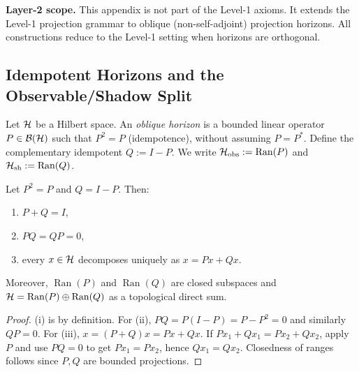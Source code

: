 \label{sec:oblique-horizons}

\noindent\textbf{Layer-2 scope.}
This appendix is not part of the Level-1 axioms. It extends the Level-1
projection grammar to oblique (non-self-adjoint) projection horizons. All
constructions reduce to the Level-1 setting when horizons are orthogonal.

\subsection{Idempotent Horizons and the Observable/Shadow Split}
\label{subsec:oblique-horizons-split}

\begin{definition}
\label{def:oblique-horizon}
Let $\mathcal{H}$ be a Hilbert space. An \emph{oblique horizon} is a bounded linear operator $P\in \mathcal{B}(\mathcal{H})$ such that $P^2 = P$ (idempotence), without assuming $P=P^\ast$.
Define the complementary idempotent $Q := I - P$.
We write $\mathcal{H}_{\mathrm{obs}} := \operatorname{Ran}(P)$ and $\mathcal{H}_{\mathrm{sh}} := \operatorname{Ran}(Q)$.
\end{definition}

\begin{lemma}
\label{lem:idempotent-split-algebra}
Let $P^2=P$ and $Q=I-P$. Then:
\begin{enumerate}[label=(\roman*)]
\item $P+Q=I$,
\item $PQ=QP=0$,
\item every $x\in \mathcal{H}$ decomposes uniquely as $x = Px + Qx$.
\end{enumerate}
Moreover, $\operatorname{Ran}(P)$ and $\operatorname{Ran}(Q)$ are closed subspaces and $\mathcal{H} = \operatorname{Ran}(P)\oplus \operatorname{Ran}(Q)$ as a topological direct sum.
\end{lemma}

\begin{proof}
(i) is by definition. For (ii),
$PQ = P(I-P)=P-P^2=0$ and similarly $QP=0$.
For (iii), $x = (P+Q)x = Px+Qx$.
If $Px_1+Qx_1 = Px_2+Qx_2$, apply $P$ and use $PQ=0$ to get $Px_1=Px_2$, hence $Qx_1=Qx_2$.
Closedness of ranges follows since $P,Q$ are bounded projections.
\end{proof}

